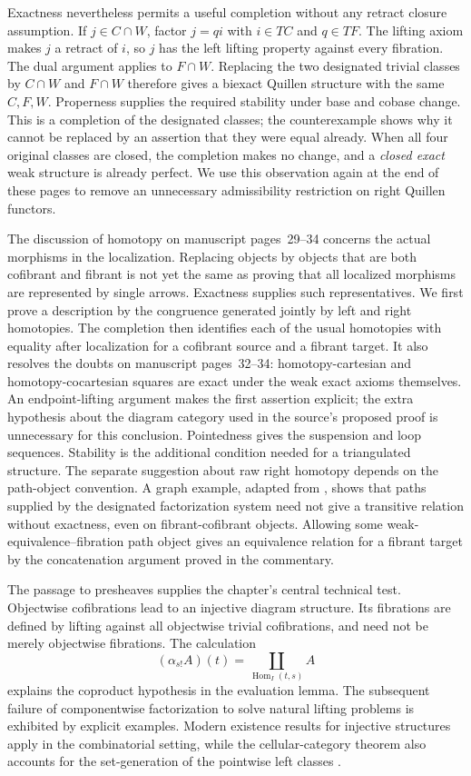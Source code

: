 Exactness nevertheless permits a useful completion without any retract
closure assumption. If $j\in C\cap W$, factor $j=qi$ with $i\in TC$ and
$q\in TF$. The lifting axiom makes $j$ a retract of $i$, so $j$ has the left
lifting property against every fibration. The dual argument applies to
$F\cap W$. Replacing the two designated trivial classes by $C\cap W$ and
$F\cap W$ therefore gives a biexact Quillen structure with the same
$C,F,W$. Properness supplies the required stability under base and cobase
change. This is a completion of the designated classes; the counterexample
shows why it cannot be replaced by an assertion that they were equal
already. When all four original classes are closed, the completion makes
no change, and a \emph{closed exact} weak structure is already perfect.
We use this observation again at the end of these pages to remove an
unnecessary admissibility restriction on right Quillen functors.

The discussion of homotopy on manuscript pages~29--34 concerns the actual
morphisms in the localization. Replacing objects by objects that are both
cofibrant and fibrant is not yet the same as proving that all localized
morphisms are represented by single arrows. Exactness supplies such
representatives. We first prove a description by the congruence generated
jointly by left and right homotopies. The completion then identifies each
of the usual homotopies with equality after localization for a cofibrant
source and a fibrant target. It also resolves the doubts on manuscript
pages~32--34: homotopy-cartesian and homotopy-cocartesian squares are exact
under the weak exact axioms themselves. An endpoint-lifting argument makes
the first assertion explicit; the extra hypothesis about the diagram
category used in the source's proposed proof is unnecessary for this
conclusion. Pointedness gives the suspension and loop sequences. Stability
is the additional condition needed for a triangulated structure. The
separate suggestion about raw right homotopy depends on the path-object
convention. A graph example, adapted from \citet[Example~3.6]{KurzRosicky2005},
shows that paths supplied by the designated factorization system need not
give a transitive relation without exactness, even on fibrant-cofibrant
objects. Allowing some weak-equivalence--fibration path object gives an
equivalence relation for a fibrant target by the concatenation argument
proved in the commentary.

The passage to presheaves supplies the chapter's central technical test.
Objectwise cofibrations lead to an injective diagram structure. Its
fibrations are defined by lifting against all objectwise trivial
cofibrations, and need not be merely objectwise fibrations. The calculation
\[
 (\alpha_{s!}A)(t)=\coprod_{\operatorname{Hom}_I(t,s)} A
\]
explains the coproduct hypothesis in the evaluation lemma. The subsequent
failure of componentwise factorization to solve natural lifting problems
is exhibited by explicit examples. Modern existence results for injective
structures apply in the combinatorial setting, while the cellular-category
theorem also accounts for the set-generation of the pointwise left
classes \citep[Corollary~3.4]{MakkaiRosicky2014Cellular}.

